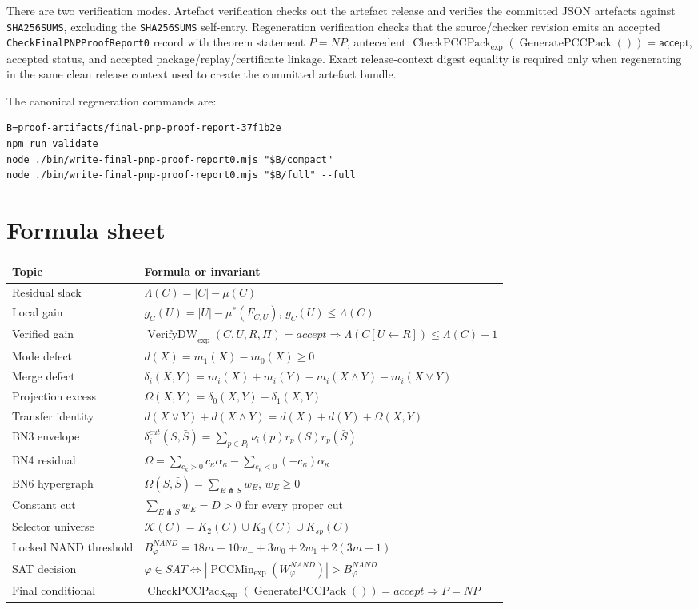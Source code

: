 \documentclass[10.5pt,a4paper]{article}
\newcommand{\VerifyDW}{\operatorname{VerifyDW}_{\exp}}
\newcommand{\PCCMin}{\operatorname{PCCMin}_{\exp}}
\newcommand{\CheckPack}{\operatorname{CheckPCCPack}_{\exp}}
\newcommand{\GenPack}{\operatorname{GeneratePCCPack}}
\newcommand{\cut}{\pitchfork}
\begin{document}
There are two verification modes.  Artefact verification checks out the artefact release and verifies the committed JSON artefacts against \texttt{SHA256SUMS}, excluding the \texttt{SHA256SUMS} self-entry.  Regeneration verification checks that the source/checker revision emits an accepted \texttt{CheckFinalPNPProofReport0} record with theorem statement \(P=NP\), antecedent \(\CheckPack(\GenPack())=\mathsf{accept}\), accepted status, and accepted package/replay/certificate linkage.  Exact release-context digest equality is required only when regenerating in the same clean release context used to create the committed artefact bundle.

The canonical regeneration commands are:
\begin{lstlisting}
B=proof-artifacts/final-pnp-proof-report-37f1b2e
npm run validate
node ./bin/write-final-pnp-proof-report0.mjs "$B/compact"
node ./bin/write-final-pnp-proof-report0.mjs "$B/full" --full
\end{lstlisting}

\section{Formula sheet}
\begin{longtable}{>{\raggedright\arraybackslash}p{}p{}}
\toprule
Topic & Formula or invariant\\
\midrule
Residual slack & \(\Lambda(C)=|C|-\mu(C)\)\\
Local gain & \(g_C(U)=|U|-\mu^*(F_{C,U})\), \(g_C(U)\le\Lambda(C)\)\\
Verified gain & \(\VerifyDW(C,U,R,\Pi)=accept\Rightarrow\Lambda(C[U\leftarrow R])\le\Lambda(C)-1\)\\
Mode defect & \(d(X)=m_1(X)-m_0(X)\ge0\)\\
Merge defect & \(\delta_i(X,Y)=m_i(X)+m_i(Y)-m_i(X\wedge Y)-m_i(X\vee Y)\)\\
Projection excess & \(\Omega(X,Y)=\delta_0(X,Y)-\delta_1(X,Y)\)\\
Transfer identity & \(d(X\vee Y)+d(X\wedge Y)=d(X)+d(Y)+\Omega(X,Y)\)\\
BN3 envelope & \(\delta_i^{cut}(S,\bar S)=\sum_{p\in P_i}\nu_i(p)r_p(S)r_p(\bar S)\)\\
BN4 residual & \(\Omega=\sum_{c_\kappa>0}c_\kappa\alpha_\kappa-\sum_{c_\kappa<0}(-c_\kappa)\alpha_\kappa\)\\
BN6 hypergraph & \(\Omega(S,\bar S)=\sum_{E\cut S}w_E\), \(w_E\ge0\)\\
Constant cut & \(\sum_{E\cut S}w_E=D>0\) for every proper cut\\
Selector universe & \(\mathcal K(C)=K_2(C)\cup K_3(C)\cup K_{sp}(C)\)\\
Locked NAND threshold & \(B^{NAND}_\varphi=18m+10w_=+3w_0+2w_1+2(3m-1)\)\\
SAT decision & \(\varphi\in SAT\Longleftrightarrow |\PCCMin(W^{NAND}_\varphi)|>B^{NAND}_\varphi\)\\
Final conditional & \(\CheckPack(\GenPack())=accept\Rightarrow P=NP\)\\
\bottomrule
\end{longtable}
\end{document}
